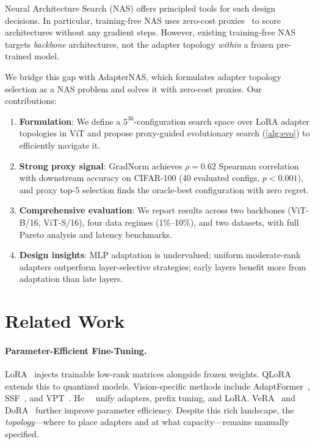 \documentclass[10pt,twocolumn,letterpaper]{article}
\newcommand{\method}{AdapterNAS\xspace}
\begin{document}
Neural Architecture Search (NAS) offers principled tools for such design decisions. In particular, training-free NAS uses zero-cost proxies~\cite{abdelfattah2021zerocost, mellor2021naswot} to score architectures without any gradient steps. However, existing training-free NAS targets \emph{backbone} architectures, not the adapter topology \emph{within} a frozen pre-trained model.

We bridge this gap with \method, which formulates adapter topology selection as a NAS problem and solves it with zero-cost proxies. Our contributions:

\begin{enumerate}
\setlength\itemsep{0pt}
\item \textbf{Formulation}: We define a $5^{36}$-configuration search space over LoRA adapter topologies in ViT and propose proxy-guided evolutionary search (\cref{alg:evo}) to efficiently navigate it.
\item \textbf{Strong proxy signal}: GradNorm achieves $\rho = 0.62$ Spearman correlation with downstream accuracy on CIFAR-100 (40 evaluated configs, $p < 0.001$), and proxy top-5 selection finds the oracle-best configuration with zero regret.
\item \textbf{Comprehensive evaluation}: We report results across two backbones (ViT-B/16, ViT-S/16), four data regimes (1\%--10\%), and two datasets, with full Pareto analysis and latency benchmarks.
\item \textbf{Design insights}: MLP adaptation is undervalued; uniform moderate-rank adapters outperform layer-selective strategies; early layers benefit more from adaptation than late layers.
\end{enumerate}

\section{Related Work}
\label{sec:related}

\paragraph{Parameter-Efficient Fine-Tuning.}
LoRA~\cite{hu2022lora} injects trainable low-rank matrices alongside frozen weights. QLoRA~\cite{dettmers2023qlora} extends this to quantized models. Vision-specific methods include AdaptFormer~\cite{chen2022adaptformer}, SSF~\cite{lian2022ssf}, and VPT~\cite{jia2022vpt}. He~\etal~\cite{he2022unified} unify adapters, prefix tuning, and LoRA. VeRA~\cite{kopiczko2024vera} and DoRA~\cite{liu2024dora} further improve parameter efficiency. Despite this rich landscape, the \emph{topology}---where to place adapters and at what capacity---remains manually specified.
\end{document}
